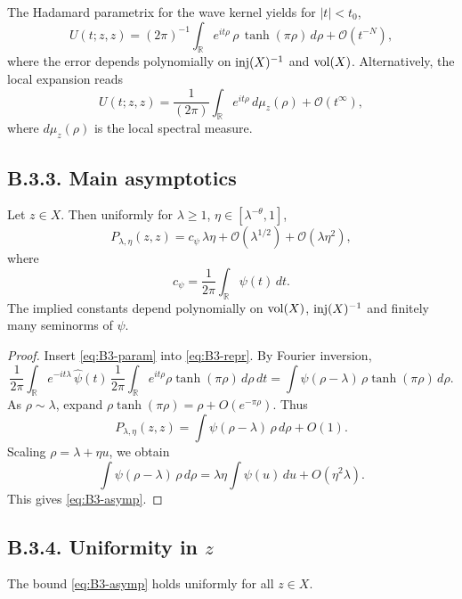 The Hadamard parametrix for the wave kernel yields for $|t|<t_0$,
\begin{equation}\label{eq:B3-param}
U(t;z,z)=(2\pi)^{-1}\int_{\mathbb{R}} e^{it\rho}\,\rho\,\tanh(\pi\rho)\,d\rho
+\mathcal{O}(t^{-N}),
\end{equation}
where the error depends polynomially on $\operatorname{inj}(X)^{-1}$ and $\operatorname{vol}(X)$.
Alternatively, the local expansion reads
\[
U(t;z,z)=\frac{1}{(2\pi)}\int_{\mathbb{R}} e^{it\rho}\,d\mu_z(\rho)+\mathcal{O}(t^\infty),
\]
where $d\mu_z(\rho)$ is the local spectral measure.

\subsection*{B.3.3. Main asymptotics}

\begin{proposition}\label{prop:B3}
Let $z\in X$.
Then uniformly for $\lambda\ge 1$, $\eta\in[\lambda^{-\theta},1]$,
\begin{equation}\label{eq:B3-asymp}
P_{\lambda,\eta}(z,z)=c_\psi\,\lambda\eta+\mathcal{O}\!\left(\lambda^{1/2}\right)
+\mathcal{O}(\lambda\eta^2),
\end{equation}
where
\[
c_\psi=\frac{1}{2\pi}\int_{\mathbb{R}}\psi(t)\,dt.
\]
The implied constants depend polynomially on $\operatorname{vol}(X)$, $\operatorname{inj}(X)^{-1}$ and finitely many seminorms of $\psi$.
\end{proposition}

\begin{proof}
Insert \eqref{eq:B3-param} into \eqref{eq:B3-repr}.
By Fourier inversion,
\[
\frac{1}{2\pi}\int_{\mathbb{R}} e^{-it\lambda}\,\widehat{\psi}(t)\,
\frac{1}{2\pi}\int_{\mathbb{R}} e^{it\rho}\rho\tanh(\pi\rho)\,d\rho\,dt
=\int \psi(\rho-\lambda)\,\rho\tanh(\pi\rho)\,d\rho.
\]
As $\rho\sim \lambda$, expand $\rho\tanh(\pi\rho)=\rho+O(e^{-\pi\rho})$.
Thus
\[
P_{\lambda,\eta}(z,z)=\int \psi(\rho-\lambda)\,\rho\,d\rho+O(1).
\]
Scaling $\rho=\lambda+\eta u$, we obtain
\[
\int \psi(\rho-\lambda)\,\rho\,d\rho
=\lambda\eta\int \psi(u)\,du+O(\eta^2\lambda).
\]
This gives \eqref{eq:B3-asymp}.
\end{proof}

\subsection*{B.3.4. Uniformity in $z$}

\begin{lemma}\label{lem:B3-unif}
The bound \eqref{eq:B3-asymp} holds uniformly for all $z\in X$.
\end{lemma}


